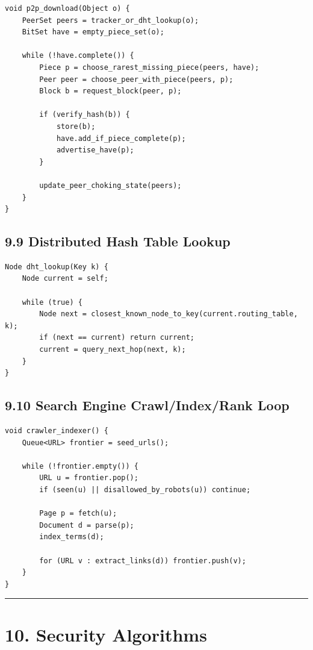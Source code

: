 \documentclass[11pt]{article}
\begin{document}
\begin{verbatim}
void p2p_download(Object o) {
    PeerSet peers = tracker_or_dht_lookup(o);
    BitSet have = empty_piece_set(o);

    while (!have.complete()) {
        Piece p = choose_rarest_missing_piece(peers, have);
        Peer peer = choose_peer_with_piece(peers, p);
        Block b = request_block(peer, p);

        if (verify_hash(b)) {
            store(b);
            have.add_if_piece_complete(p);
            advertise_have(p);
        }

        update_peer_choking_state(peers);
    }
}
\end{verbatim}

\subsection{9.9 Distributed Hash Table
Lookup}\label{distributed-hash-table-lookup}

\begin{verbatim}
Node dht_lookup(Key k) {
    Node current = self;

    while (true) {
        Node next = closest_known_node_to_key(current.routing_table, k);
        if (next == current) return current;
        current = query_next_hop(next, k);
    }
}
\end{verbatim}

\subsection{9.10 Search Engine Crawl/Index/Rank
Loop}\label{search-engine-crawlindexrank-loop}

\begin{verbatim}
void crawler_indexer() {
    Queue<URL> frontier = seed_urls();

    while (!frontier.empty()) {
        URL u = frontier.pop();
        if (seen(u) || disallowed_by_robots(u)) continue;

        Page p = fetch(u);
        Document d = parse(p);
        index_terms(d);

        for (URL v : extract_links(d)) frontier.push(v);
    }
}
\end{verbatim}

\begin{center}\rule{0.5\linewidth}{0.5pt}\end{center}

\section{10. Security Algorithms}\label{security-algorithms}
\end{document}
